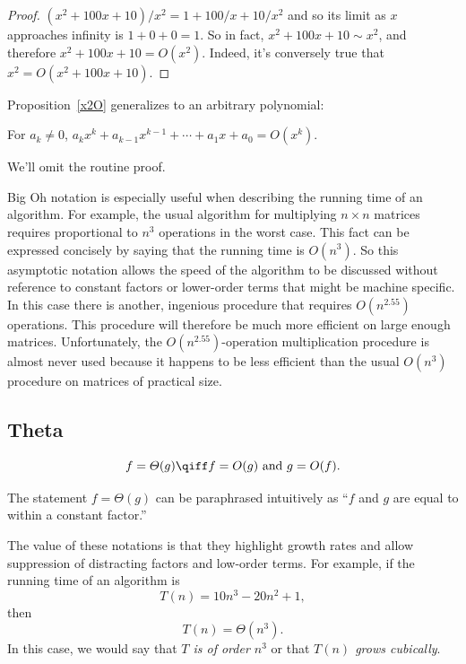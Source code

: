 \begin{proof}
$(x^2 + 100x + 10)/x^2 = 1 + 100/x + 10/x^2$ and so its limit as $x$
approaches infinity is $1 + 0 + 0 = 1$.  So in fact, $x^2 + 100x + 10 \sim
x^2$, and therefore $x^2 + 100x + 10 = O(x^2)$.  Indeed, it's conversely
true that $x^2= O(x^2 + 100x + 10)$.
\end{proof}

Proposition~\ref{x2O} generalizes to an arbitrary polynomial:
\begin{proposition}
For $a_k\neq 0$, $a_k x^k + a_{k-1} x^{k-1} + \cdots + a_1x + a_0 = O(x^k)$.
\end{proposition}
We'll omit the routine proof.

Big Oh notation is especially useful when describing the running time of
an algorithm.  For example, the usual algorithm for multiplying $n \times
n$ matrices requires proportional to $n^3$ operations in the worst case.
This fact can be expressed concisely by saying that the running time is
$O(n^3)$.  So this asymptotic notation allows the speed of the algorithm
to be discussed without reference to constant factors or lower-order terms
that might be machine specific.  In this case there is another, ingenious
 procedure that requires $O(n^{2.55})$
operations.  This procedure will therefore be much more efficient on large
enough matrices.  Unfortunately, the $O(n^{2.55})$-operation
multiplication procedure is almost never used because it happens to be
less efficient than the usual $O(n^3)$ procedure on matrices of practical
size.  

\subsection{\index{$\Theta()$}Theta}

\begin{definition}
\[
f = \varTheta(g)
\qiff
f=O(g) \text{ and } g=O(f).
\]
\end{definition}

The statement $f = \varTheta(g)$ can be paraphrased intuitively as ``$f$
and $g$ are equal to within a constant factor.''

The value of these notations is that they highlight growth rates and allow
suppression of distracting factors and low-order terms.  For example, if
the running time of an algorithm is
\[
T(n) = 10n^3 - 20n^2 + 1,
\]
then
\[
T(n) = \varTheta(n^3).
\]
In this case, we would say that \emph{$T$ is of order $n^3$} or that
\emph{$T(n)$ grows cubically}.


